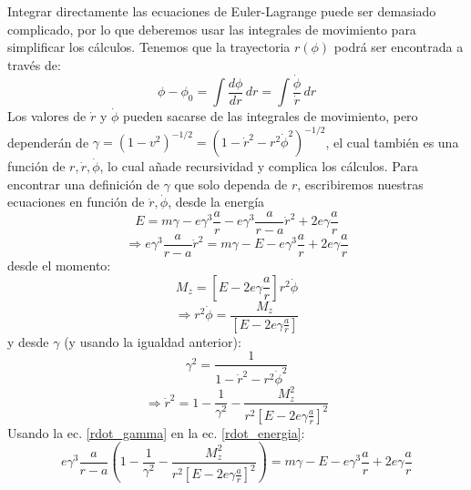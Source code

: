 \documentclass[]{article}
\numberwithin{equation}{section}
\newcommand{\0}{\textcolor{gray}{0}}
\newcommand{\td}[2]{\dfrac{d #1}{d #2}}
\begin{document}
\begin{enumerate}
\begin{enumerate}
		Integrar directamente las ecuaciones de Euler-Lagrange puede ser demasiado complicado, por lo que deberemos usar las integrales de movimiento para simplificar los cálculos. Tenemos que la trayectoria \(r(\phi)\) podrá ser encontrada a través de:
		\begin{equation}
			\phi - \phi_0 = \int \td{\phi}{r} \, dr = \int \frac{\dot{\phi}}{\dot{r}} \, dr \label{int}
		\end{equation}
		Los valores de \(\dot{r}\) y \(\dot{\phi}\) pueden sacarse de las integrales de movimiento, pero dependerán de \(\gamma = \left(1 - v^2\right)^{-1/2} = \left(1 - \dot{r}^2 - r^2\dot{\phi}^2 \right)^{-1/2}\), el cual también es una función de \(r, \dot{r}, \dot{\phi}\), lo cual añade recursividad y complica los cálculos. Para encontrar una definición de \(\gamma\) que solo dependa de \(r\), escribiremos nuestras ecuaciones en función de \(\dot{r}, \dot{\phi}\), desde la energía
		\begin{equation*}
			E = m \gamma - e \gamma^3\frac{a}{r} - e \gamma^3 \frac{a}{r - a}\dot{r}^2 + 2 e \gamma \frac{a}{r}
		\end{equation*}
		\begin{equation}
			\Rightarrow e \gamma^3 \frac{a}{r - a}\dot{r}^2 = m \gamma - E - e \gamma^3\frac{a}{r} + 2 e \gamma \frac{a}{r}
			\label{rdot_energia}
		\end{equation}
		desde el momento:
		\begin{equation*}
			M_z = \left[E - 2 e \gamma \frac{a}{r}\right] r^2 \dot{\phi}
		\end{equation*}
		\begin{equation}
			\Rightarrow r^2 \dot{\phi} = \frac{M_z}{\left[E - 2 e \gamma \frac{a}{r}\right]}
			\label{phidot}
		\end{equation}
		y desde \(\gamma\) (y usando la igualdad anterior):
		\begin{equation*}
			\gamma^2 = \frac{1}{1 - \dot{r}^2 - r^2\dot{\phi}^2}
		\end{equation*}
		\begin{equation}
			\Rightarrow \dot{r}^2 = 1 - \frac{1}{\gamma^2} - \frac{M_z^2}{r^2 \left[E - 2 e \gamma \frac{a}{r}\right]^2}
			\label{rdot_gamma}
		\end{equation}
		Usando la ec. \ref{rdot_gamma} en la ec. \ref{rdot_energia}:
		\begin{equation}
			e \gamma^3 \frac{a}{r - a}\left(1 - \frac{1}{\gamma^2} - \frac{M_z^2}{r^2 \left[E - 2 e \gamma \frac{a}{r}\right]^2}\right) = m \gamma - E - e \gamma^3\frac{a}{r} + 2 e \gamma \frac{a}{r}

\end{equation}
\end{enumerate}
\end{enumerate}
\end{document}
